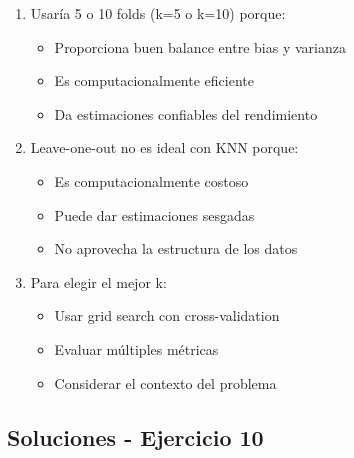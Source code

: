 \documentclass[12pt]{article}
\begin{document}
\begin{enumerate}
    \item Usaría 5 o 10 folds (k=5 o k=10) porque:
    \begin{itemize}
        \item Proporciona buen balance entre bias y varianza
        \item Es computacionalmente eficiente
        \item Da estimaciones confiables del rendimiento
    \end{itemize}
    \item Leave-one-out no es ideal con KNN porque:
    \begin{itemize}
        \item Es computacionalmente costoso
        \item Puede dar estimaciones sesgadas
        \item No aprovecha la estructura de los datos
    \end{itemize}
    \item Para elegir el mejor k:
    \begin{itemize}
        \item Usar grid search con cross-validation
        \item Evaluar múltiples métricas
        \item Considerar el contexto del problema
    \end{itemize}
\end{enumerate}

\subsection{Soluciones - Ejercicio 10}
\end{document}
